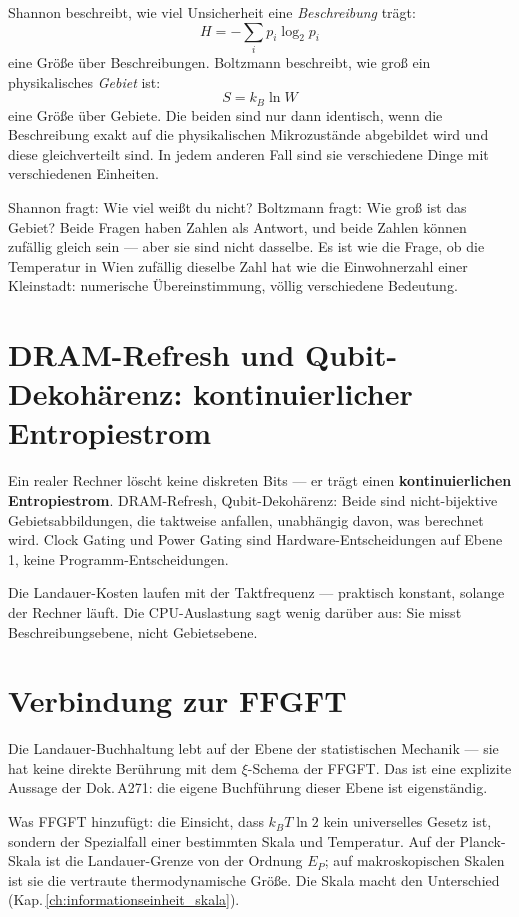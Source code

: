 Shannon beschreibt, wie viel Unsicherheit eine \emph{Beschreibung} trägt:
\[
  H = -\sum_i p_i \log_2 p_i
\]
eine Größe über Beschreibungen. Boltzmann beschreibt, wie groß ein
physikalisches \emph{Gebiet} ist:
\[
  S = k_B \ln W
\]
eine Größe über Gebiete. Die beiden sind nur dann identisch, wenn die
Beschreibung exakt auf die physikalischen Mikrozustände abgebildet wird
und diese gleichverteilt sind. In jedem anderen Fall sind sie verschiedene
Dinge mit verschiedenen Einheiten. 

\begin{laierspur}
Shannon fragt: Wie viel weißt du nicht? Boltzmann fragt: Wie groß ist das
Gebiet? Beide Fragen haben Zahlen als Antwort, und beide Zahlen können
zufällig gleich sein --- aber sie sind nicht dasselbe.
Es ist wie die Frage, ob die Temperatur in Wien zufällig dieselbe Zahl
hat wie die Einwohnerzahl einer Kleinstadt:
numerische Übereinstimmung, völlig verschiedene Bedeutung.
\end{laierspur}

\section{DRAM-Refresh und Qubit-Dekohärenz: kontinuierlicher Entropiestrom}

Ein realer Rechner löscht keine diskreten Bits --- er trägt einen
\textbf{kontinuierlichen Entropiestrom}. DRAM-Refresh, Qubit-Dekohärenz:
Beide sind nicht-bijektive Gebietsabbildungen, die taktweise anfallen,
unabhängig davon, was berechnet wird. Clock Gating und Power Gating sind
Hardware-Entscheidungen auf Ebene 1, keine Programm-Entscheidungen. 

\begin{merkbox}
Die Landauer-Kosten laufen mit der Taktfrequenz --- praktisch konstant,
solange der Rechner läuft. Die CPU-Auslastung sagt wenig darüber aus:
Sie misst Beschreibungsebene, nicht Gebietsebene.
\end{merkbox}

\section{Verbindung zur FFGFT}

Die Landauer-Buchhaltung lebt auf der Ebene der statistischen Mechanik ---
sie hat keine direkte Berührung mit dem $\xi$-Schema der FFGFT.
Das ist eine explizite Aussage der Dok.\,A271:
die eigene Buchführung dieser Ebene ist eigenständig.

Was FFGFT hinzufügt: die Einsicht, dass $k_BT\ln 2$ kein universelles
Gesetz ist, sondern der Spezialfall einer bestimmten Skala und Temperatur.
Auf der Planck-Skala ist die Landauer-Grenze von der Ordnung $E_P$;
auf makroskopischen Skalen ist sie die vertraute thermodynamische Größe.
Die Skala macht den Unterschied (Kap.\,\ref{ch:informationseinheit_skala}).

